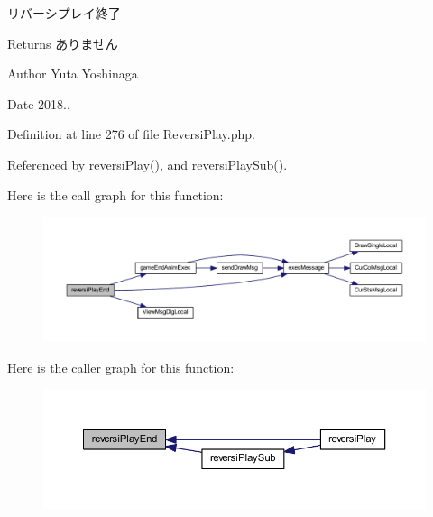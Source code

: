 リバーシプレイ終了 

\begin{DoxyReturn}{Returns}
ありません 
\end{DoxyReturn}
\begin{DoxyAuthor}{Author}
Yuta Yoshinaga 
\end{DoxyAuthor}
\begin{DoxyDate}{Date}
2018.. 
\end{DoxyDate}


Definition at line 276 of file Reversi\+Play.\+php.



Referenced by reversi\+Play(), and reversi\+Play\+Sub().



Here is the call graph for this function\+:
\nopagebreak
\begin{figure}[H]
\begin{center}
\leavevmode
\includegraphics[width=350pt]{class_reversi_play_af55fe6b6f2005c7da80c696ed692783d_cgraph}
\end{center}
\end{figure}




Here is the caller graph for this function\+:
\nopagebreak
\begin{figure}[H]
\begin{center}
\leavevmode
\includegraphics[width=350pt]{class_reversi_play_af55fe6b6f2005c7da80c696ed692783d_icgraph}
\end{center}
\end{figure}


